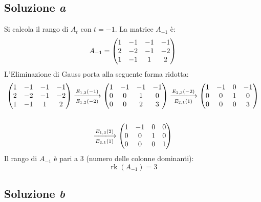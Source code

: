 \documentclass[a4paper]{article}
\makeatletter
\DeclareMathOperator{\rk}{rk}
\newenvironment{rowequmat}[1]{\left(\array{@{}#1@{}}}{\endarray\right)}
\makeatother
\begin{document}
	\subsection{Soluzione \emph{a}}
	
	Si calcola il rango di $A_{t}$ con $t = -1$. La matrice $A_{-1}$ è:
	\begin{equation*}
		A_{-1} = \begin{rowequmat}{cccc}
			1 & -1 & -1 & -1 \\
			2 & -2 & -1 & -2 \\
			1 & -1 &  1 &  2
		\end{rowequmat}
	\end{equation*}
	L'Eliminazione di Gauss porta alla seguente forma ridotta:
	\begin{gather*}
		\begin{rowequmat}{cccc}
			1 & -1 & -1 & -1 \\
			2 & -2 & -1 & -2 \\
			1 & -1 &  1 &  2
		\end{rowequmat} \xlongrightarrow[E_{1,2}\left(-2\right)]{E_{1,3}\left(-1\right)}
		\begin{rowequmat}{cccc}
			1 & -1 & -1 & -1 \\
			0 & 0 & 1 & 0 \\
			0 & 0 &  2 &  3
		\end{rowequmat} \xlongrightarrow[E_{2,1}\left(1\right)]{E_{2,3}\left(-2\right)}
		\begin{rowequmat}{cccc}
			1 & -1 &  0 & -1 \\
			0 &  0 &  1 &  0 \\
			0 &  0 &  0 &  3
		\end{rowequmat} \\
		\\
		\xlongrightarrow[E_{3,1}\left(1\right)]{E_{1,3}\left(2\right)}
		\begin{rowequmat}{cccc}
			1 & -1 &  0 &  0 \\
			0 &  0 &  1 &  0 \\
			0 &  0 &  0 &  1
		\end{rowequmat}
	\end{gather*}
	Il rango di $A_{-1}$ è pari a $3$ (numero delle colonne dominanti):
	\begin{equation*}
		\rk\left(A_{-1}\right) = 3
	\end{equation*}

	\subsection{Soluzione \emph{b}}
	
\end{document}
